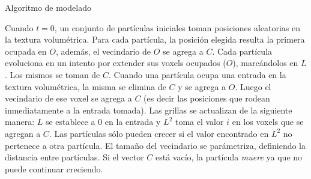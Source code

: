 \begin{algorithm}[h!]
\caption{Algoritmo de modelado}
\begin{algorithmic}


    \EndFor
\EndFor

        \EndIf
                 
                 
            \EndIf
        \EndFor
    \EndFor
\EndFor
\end{algorithmic}
\end{algorithm}

Cuando $t = 0$, un conjunto de part\'iculas iniciales toman posiciones aleatorias en la textura volumétrica.
Para cada partícula, la posici\'on elegida resulta la primera ocupada en $O$, adem\'as, el vecindario de $O$ se agrega a $C$.
Cada part\'icula evoluciona en un intento por extender sus voxels ocupados ($O$), marcándolos en $L$. Los mismos se toman de $C$.
Cuando una part\'icula ocupa una entrada en la textura volumétrica, la misma se elimina de $C$ y se agrega a $O$.
Luego el vecindario de ese voxel se agrega a $C$ (es decir las posiciones que rodean inmediatamente a la entrada tomada).
Las grillas se actualizan de la siguiente manera: $L$ se establece a $0$ en la entrada y $L^{2}$ toma el valor $i$ en los voxels que se agregan a $C$. Las part\'iculas s\'olo pueden crecer si el valor encontrado en $L^{2}$ no pertenece a otra part\'icula.
El tama\~no del vecindario se par\'ametriza, definiendo la distancia entre part\'iculas.
Si el vector $C$ est\'a vac\'io, la part\'icula {\em muere} ya que no puede continuar creciendo.



